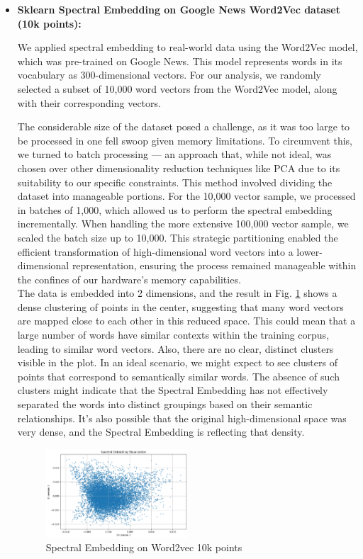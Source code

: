 \begin{itemize}
\begin{itemize}
            \item \textbf{Sklearn Spectral Embedding on Google News Word2Vec dataset (10k points):}
           
            We applied spectral embedding to real-world data using the Word2Vec model, which was pre-trained on Google News. This model represents words in its vocabulary as 300-dimensional vectors. For our analysis, we randomly selected a subset of 10,000 word vectors from the Word2Vec model, along with their corresponding vectors.

            The considerable size of the dataset posed a challenge, as it was too large to be processed in one fell swoop given memory limitations. To circumvent this, we turned to batch processing — an approach that, while not ideal, was chosen over other dimensionality reduction techniques like PCA due to its suitability to our specific constraints. This method involved dividing the dataset into manageable portions. For the 10,000 vector sample, we processed in batches of 1,000, which allowed us to perform the spectral embedding incrementally. When handling the more extensive 100,000 vector sample, we scaled the batch size up to 10,000. This strategic partitioning enabled the efficient transformation of high-dimensional word vectors into a lower-dimensional representation, ensuring the process remained manageable within the confines of our hardware's memory capabilities.
\\

            The data is embedded into 2 dimensions, and the result in Fig. \ref{fig:Spectral Embedding on Word2vec 10k points} shows a dense clustering of points in the center, suggesting that many word vectors are mapped close to each other in this reduced space. This could mean that a large number of words have similar contexts within the training corpus, leading to similar word vectors. Also, there are no clear, distinct clusters visible in the plot. In an ideal scenario, we might expect to see clusters of points that correspond to semantically similar words. The absence of such clusters might indicate that the Spectral Embedding has not effectively separated the words into distinct groupings based on their semantic relationships. It's also possible that the original high-dimensional space was very dense, and the Spectral Embedding is reflecting that density.
            
             \begin{figure}[H]
                  \centering
                  \includegraphics[width=0.5\textwidth]{images/sklearn (8).png}
                  \caption{Spectral Embedding on Word2vec 10k points}
                  \label{fig:Spectral Embedding on Word2vec 10k points}
              \end{figure}
	      

\end{itemize}
\end{itemize}
